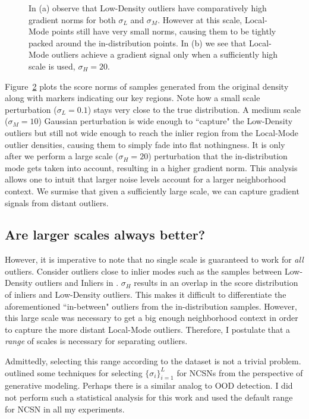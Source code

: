 \begin{figure}[tbhp]
\begin{subfigure}[b]{0.45\textwidth}
    \label{fig:score_norms_3d}
\end{subfigure}
\caption{In (a) observe that Low-Density outliers have comparatively high gradient norms for both $\sigma_{L}$ and $\sigma_{M}$. However at this scale, Local-Mode points still have very small norms, causing them to be tightly packed around the in-distribution points. In (b) we see that Local-Mode outliers achieve a gradient signal only when a sufficiently high scale is used, $\sigma_{H}=20$.}
\label{fig:norm_plots}
\end{figure}

Figure~\ref{fig:norm_plots} plots the score norms of samples generated from the original density along with markers indicating our key regions. Note how a small scale perturbation ($\sigma_{L}=0.1$) stays very close to the true distribution. A medium scale ($\sigma_{M}=10$) Gaussian perturbation is wide enough to ``capture" the Low-Density outliers but still not wide enough to reach the inlier region from the Local-Mode outlier densities, causing them to simply fade into flat nothingness. It is only after we perform a large scale ($\sigma_{H}=20$) perturbation that the in-distribution mode gets taken into account, resulting in a higher gradient norm. This analysis allows one to intuit that larger noise levels account for a larger neighborhood context. We surmise that given a sufficiently large scale, we can capture gradient signals from distant outliers.

\subsection*{Are larger scales always better?}

However, it is imperative to note that no single scale is guaranteed to work for \textit{all} outliers. Consider outliers close to inlier modes such as the samples between Low-Density outliers and Inliers in . $\sigma_H$ results in an overlap in the score distribution of inliers and Low-Density outliers. This makes it difficult to differentiate the aforementioned ``in-between" outliers from the in-distribution samples. However, this large scale was necessary to get a big enough neighborhood context in order to capture the more distant Local-Mode outliers. Therefore, I postulate that a \emph{range} of scales is necessary for separating outliers.

Admittedly, selecting this range according to the dataset is not a trivial problem. \cite{song2020improved} outlined some techniques for selecting $\{\sigma_i\}_{i=1}^L$ for NCSNs from the perspective of generative modeling. Perhaps there is a similar analog to OOD detection. I did not perform such a statistical analysis for this work and used the default range for NCSN in all my experiments. 

